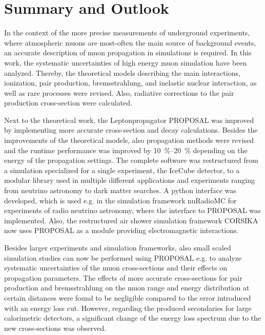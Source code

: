 \chapter{Summary and Outlook} \label{sec:outlook}

In the context of the more precise measurements of underground experiments, where atmospheric muons are most-often the main source of background events, an accurate description of muon propagation in simulations is required.
In this work, the systematic uncertainties of high energy muon simulation have been analyzed.
Thereby, the theoretical models describing the main interactions, ionization, pair production, bremsstrahlung, and inelastic nuclear interaction, as well as rare processes were revised.
Also, radiative corrections to the pair production cross-section were calculated.

Next to the theoretical work, the Leptonpropagator PROPOSAL was improved by implementing more accurate cross-section and decay calculations.
Besides the improvements of the theoretical models, also propagation methods were revised and the runtime performance was improved by \SIrange{10}{20}{\%} depending on the energy of the propagation settings.
The complete software was restructured from a simulation specialized for a single experiment, the IceCube detector, to a modular library used in multiple different applications and experiments ranging from neutrino astronomy to dark matter searches.
A python interface was developed, which is used e.g. in the simulation framework nuRadioMC for experiments of radio neutrino astronomy, where the interface to PROPOSAL was implemented.
Also, the restructured air shower simulation framework CORSIKA now uses PROPOSAL as a module providing electromagnetic interactions.

Besides larger experiments and simulation frameworks, also small scaled simulation studies can now be performed using PROPOSAL e.g. to analyze systematic uncertainties of the muon cross-sections and their effects on propagation parameters.
The effects of more accurate cross-sections for pair production and bremsstrahlung on the muon range and energy distribution at certain distances were found to be negligible compared to the error introduced with an energy loss cut.
However, regarding the produced secondaries for large calorimetric detectors, a significant change of the energy loss spectrum due to the new cross-sections was observed.

